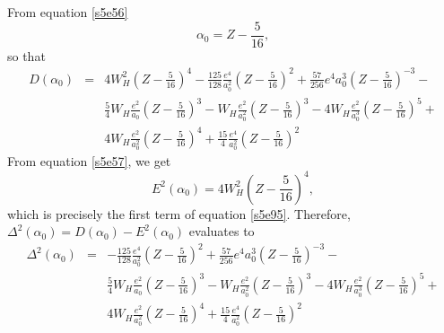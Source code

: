 \documentclass{article}
\numberwithin{equation}{section}
\begin{document}
From equation \eqref{s5e56}
\[
\alpha_0 = Z - \frac{5}{16},
\]
so that
\begin{eqnarray}
D(\alpha_0) &=& 4W_H^2\left(Z - \frac{5}{16}\right)^4 - \frac{125}{128}
\frac{e^4}{a_0^2}\left(Z - \frac{5}{16}\right)^2 + \frac{57}{256}e^4a_0^3
\left(Z - \frac{5}{16}\right)^{-3} - \nonumber \\
 & & \frac{5}{4}W_H\frac{e^2}{a_0}\left(Z - \frac{5}{16}\right)^3 -
 W_H\frac{e^2}{a_0^2}\left(Z - \frac{5}{16}\right)^3 - 4W_H\frac{e^2}
{a_0^3}\left(Z - \frac{5}{16}\right)^5 + \nonumber \\
 & & 4W_H\frac{e^2}{a_0^2}\left(Z - \frac{5}{16}\right)^4 + \frac{15}{4}
 \frac{e^4}{a_0^2}\left(Z - \frac{5}{16}\right)^2 \label{s5e95}
\end{eqnarray}
From equation \eqref{s5e57}, we get
\[
E^2(\alpha_0) = 4W_H^2\left(Z - \frac{5}{16}\right)^4,
\]
which is precisely the first term of equation \eqref{s5e95}. Therefore,
$\Delta^2(\alpha_0) = D(\alpha_0) - E^2(\alpha_0)$ evaluates to
\begin{eqnarray}
\Delta^2(\alpha_0) &=& - \frac{125}{128}
\frac{e^4}{a_0^2}\left(Z - \frac{5}{16}\right)^2 + \frac{57}{256}e^4a_0^3
\left(Z - \frac{5}{16}\right)^{-3} - \nonumber \\
 & & \frac{5}{4}W_H\frac{e^2}{a_0}\left(Z - \frac{5}{16}\right)^3 -
 W_H\frac{e^2}{a_0^2}\left(Z - \frac{5}{16}\right)^3 - 4W_H\frac{e^2}
{a_0^3}\left(Z - \frac{5}{16}\right)^5 + \nonumber \\
 & & 4W_H\frac{e^2}{a_0^2}\left(Z - \frac{5}{16}\right)^4 + \frac{15}{4}
 \frac{e^4}{a_0^2}\left(Z - \frac{5}{16}\right)^2 \label{s5e96}
\end{eqnarray}
\end{document}
